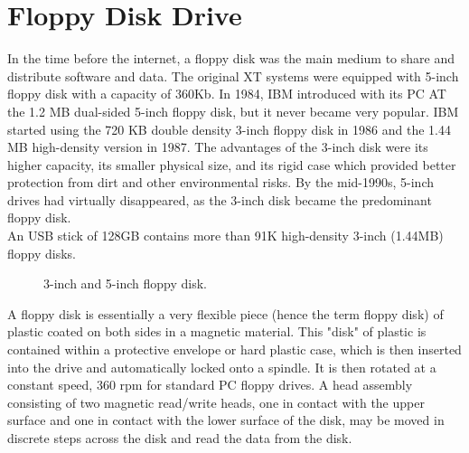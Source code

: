 \documentclass[book.tex]{subfiles}
\begin{document}
\section{Floppy Disk Drive}
In the time before the internet, a floppy disk was the main medium to share and distribute software and data. The original XT systems were equipped with 5-inch floppy disk with a capacity of 360Kb. In 1984, IBM introduced with its PC AT the 1.2 MB dual-sided 5-inch floppy disk, but it never became very popular. IBM started using the 720 KB double density 3-inch floppy disk in 1986 and the 1.44 MB high-density version in 1987. The advantages of the 3-inch disk were its higher capacity, its smaller physical size, and its rigid case which provided better protection from dirt and other environmental risks. By the mid-1990s, 5-inch drives had virtually disappeared, as the 3-inch disk became the predominant floppy disk. \\

\vspace{10pt}
 An USB stick of 128GB contains more than 91K high-density 3-inch (1.44MB) floppy disks.\\
\par

\begin{figure}[H]

  \begin{minipage}{0.48\textwidth}
  \centering
  \end{minipage}
  \hfill
  \begin{minipage}{0.48\textwidth}
  \centering
  \end{minipage}
  \caption{3-inch and 5-inch floppy disk.}
  \end{figure}
\par


A floppy disk is essentially a very flexible piece (hence the term floppy disk) of plastic coated on both sides in a magnetic material. This "disk" of plastic is contained within a protective envelope or hard plastic case, which is then inserted into the drive and automatically locked onto a spindle. It is then rotated at a constant speed, 360 rpm for standard PC floppy drives. A head assembly consisting of two magnetic read/write heads, one in contact with the upper surface and one in contact with the lower surface of the disk, may be moved in discrete steps across the disk and read the data from the disk.\\
\end{document}
